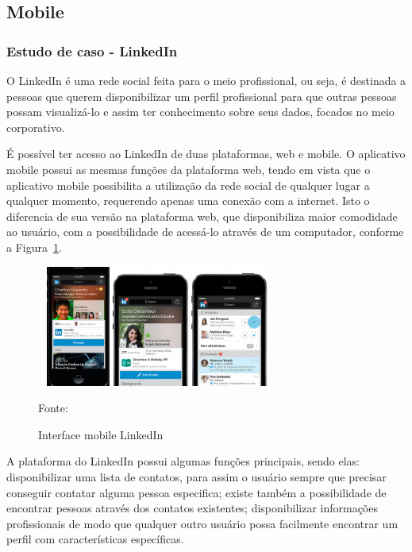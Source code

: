 \subsection{Mobile}


\subsubsection{Estudo de caso - LinkedIn}

O LinkedIn é uma rede social feita para o meio profissional, ou seja, é destinada a pessoas que querem disponibilizar um perfil profissional para que outras pessoas possam visualizá-lo e assim ter conhecimento sobre seus dados, focados no meio corporativo.

É possível ter acesso ao LinkedIn de duas plataformas, web e mobile. O aplicativo mobile possui as mesmas funções da plataforma web, tendo em vista que o aplicativo mobile possibilita a utilização da rede social de qualquer lugar a qualquer momento, requerendo apenas uma conexão com a internet. Isto o diferencia de sua versão na plataforma web, que disponibiliza maior comodidade ao usuário, com a possibilidade de acessá-lo através de um computador, conforme a Figura~\hypersetup{linkcolor=black}\ref{fig:mobile}.

\begin{figure}[!h]
	\centering
		
	\caption{Interface mobile LinkedIn}
	\includegraphics[width=300px, height=150px]{./images/linkedinMobile.png}
		\label{fig:mobile}
	\par {Fonte: \cite{linkedin-b}}
\end{figure}

A plataforma do LinkedIn possui algumas funções principais, sendo elas: disponibilizar uma lista de contatos, para assim o usuário sempre que precisar conseguir contatar alguma pessoa especifica; existe também a possibilidade de encontrar pessoas através dos contatos existentes; disponibilizar informações profissionais de modo que qualquer outro usuário possa facilmente encontrar um perfil com características específicas.

